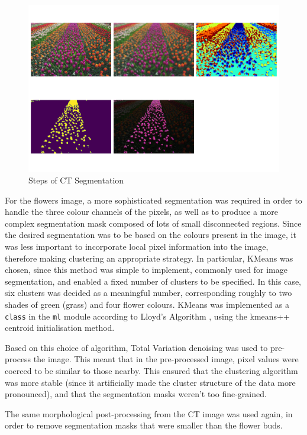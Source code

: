 \documentclass[12pt]{article}
\begin{document}
\begin{figure}[hp]
    \includegraphics[scale=0.35]{figures/flowers_segmentation.png}
    \caption{Steps of CT Segmentation}
    \label{fig:flowers}
\end{figure}

For the flowers image, a more sophisticated segmentation was required in order to handle the three colour channels of the pixels,
as well as to produce a more complex segmentation mask composed of lots of small disconnected regions.
Since the desired segmentation was to be based on the colours present in the image,
it was less important to incorporate local pixel information into the image,
therefore making clustering an appropriate strategy.
In particular, KMeans was chosen, since this method was simple to implement,
commonly used for image segmentation,
and enabled a fixed number of clusters to be specified.
In this case, six clusters was decided as a meaningful number,
corresponding roughly to two shades of green (grass) and four flower colours.
KMeans was implemented as a \texttt{class} in the \texttt{ml} module according to Lloyd's Algorithm \cite{lloyd},
using the kmeans++ \cite{kmeanspp} centroid initialisation method.

Based on this choice of algorithm, Total Variation denoising was used to pre-process the image.
This meant that in the pre-processed image, pixel values were coerced to be similar to those nearby.
This ensured that the clustering algorithm was more stable (since it artificially made the cluster structure of the data more pronounced),
and that the segmentation masks weren't too fine-grained.

The same morphological post-processing from the CT image was used again,
in order to remove segmentation masks that were smaller than the flower buds.
\end{document}
